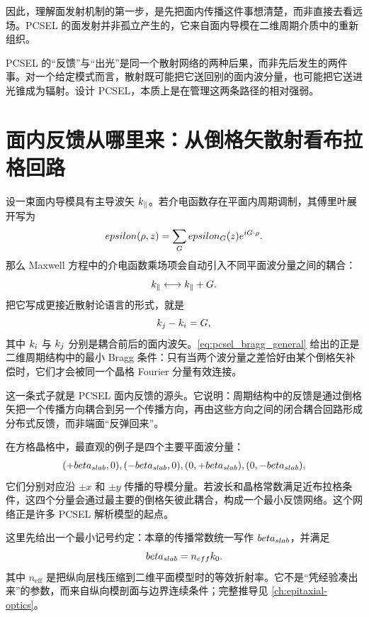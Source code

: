 因此，理解面发射机制的第一步，是先把面内传播这件事想清楚，而非直接去看远场。PCSEL 的面发射并非孤立产生的，它来自面内导模在二维周期介质中的重新组织。

\begin{IntuitionBox}
PCSEL 的“反馈”与“出光”是同一个散射网络的两种后果，而非先后发生的两件事。对一个给定模式而言，散射既可能把它送回别的面内波分量，也可能把它送进光锥成为辐射。设计 PCSEL，本质上是在管理这两条路径的相对强弱。
\end{IntuitionBox}

\section{面内反馈从哪里来：从倒格矢散射看布拉格回路}
设一束面内导模具有主导波矢 $k_\parallel$。若介电函数存在平面内周期调制，其傅里叶展开写为
\[
epsilon(\rho,z)=\sum_{G}epsilon_{G}(z)e^{iG\cdot\rho}.
\]
那么 Maxwell 方程中的介电函数乘场项会自动引入不同平面波分量之间的耦合：
\[
k_\parallel \longleftrightarrow k_\parallel+G.
\]
把它写成更接近散射论语言的形式，就是
\begin{equation}
k_j-k_i=G,
\label{eq:pcsel_bragg_general}
\end{equation}
其中 $k_i$ 与 $k_j$ 分别是耦合前后的面内波矢。\cref{eq:pcsel_bragg_general} 给出的正是二维周期结构中的最小 Bragg 条件：只有当两个波分量之差恰好由某个倒格矢补偿时，它们才会被同一个晶格 Fourier 分量有效连接。

这一条式子就是 PCSEL 面内反馈的源头。它说明：周期结构中的反馈是通过倒格矢把一个传播方向耦合到另一个传播方向，再由这些方向之间的闭合耦合回路形成分布式反馈，而非端面“反弹回来”。

在方格晶格中，最直观的例子是四个主要平面波分量：
\[
(+beta_{slab},0), (-beta_{slab},0), (0,+beta_{slab}), (0,-beta_{slab}),
\]
它们分别对应沿 $\pm x$ 和 $\pm y$ 传播的导模分量。若波长和晶格常数满足近布拉格条件，这四个分量会通过最主要的倒格矢彼此耦合，构成一个最小反馈网络。这个网络正是许多 PCSEL 解析模型的起点。

这里先给出一个最小记号约定：本章的传播常数统一写作 $beta_{slab}$，并满足
\[
beta_{slab}=n_{eff}k_0.
\]
其中 $n_{\mathrm{eff}}$ 是把纵向层栈压缩到二维平面模型时的等效折射率。它不是“凭经验凑出来”的参数，而来自纵向模剖面与边界连续条件；完整推导见 \cref{ch:epitaxial-optics}。

